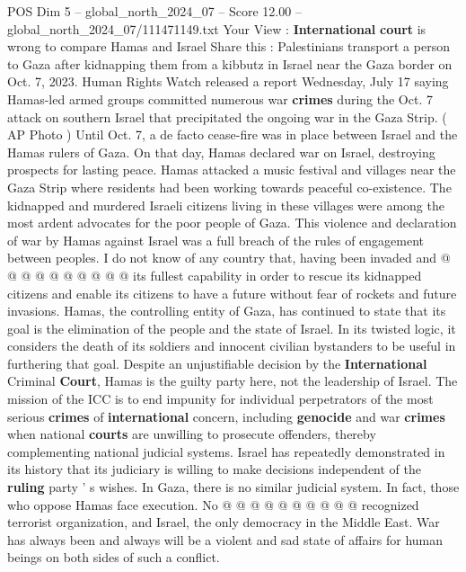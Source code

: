 \begin{textsample}{POS Dim 5 – global\_north\_2024\_07 – Score 12.00 – global\_north\_2024\_07/111471149.txt}  \label{ex:f5_pos_310}
Your View : \textbf{International} \textbf{court} is wrong to compare Hamas and Israel Share this : Palestinians transport a person to Gaza after kidnapping them from a kibbutz in Israel near the Gaza border on Oct. 7, 2023.
Human Rights Watch released a report Wednesday, July 17 saying Hamas-led armed groups committed numerous war \textbf{crimes} during the Oct. 7 attack on southern Israel that precipitated the ongoing war in the Gaza Strip. ( AP Photo ) Until Oct. 7, a de facto cease-fire was in place between Israel and the Hamas rulers of Gaza.
On that day, Hamas declared war on Israel, destroying prospects for lasting peace.
Hamas attacked a music festival and villages near the Gaza Strip where residents had been working towards peaceful co-existence.
The kidnapped and murdered Israeli citizens living in these villages were among the most ardent advocates for the poor people of Gaza.
This violence and declaration of war by Hamas against Israel was a full breach of the rules of engagement between peoples.
I do not know of any country that, having been invaded and @ @ @ @ @ @ @ @ @ @ its fullest capability in order to rescue its kidnapped citizens and enable its citizens to have a future without fear of rockets and future invasions.
Hamas, the controlling entity of Gaza, has continued to state that its goal is the elimination of the people and the state of Israel.
In its twisted logic, it considers the death of its soldiers and innocent civilian bystanders to be useful in furthering that goal.
Despite an unjustifiable decision by the \textbf{International} Criminal \textbf{Court}, Hamas is the guilty party here, not the leadership of Israel.
The mission of the ICC is to end impunity for individual perpetrators of the most serious \textbf{crimes} of \textbf{international} concern, including \textbf{genocide} and war \textbf{crimes} when national \textbf{courts} are unwilling to prosecute offenders, thereby complementing national judicial systems.
Israel has repeatedly demonstrated in its history that its judiciary is willing to make decisions independent of the \textbf{ruling} party ' s wishes.
In Gaza, there is no similar judicial system.
In fact, those who oppose Hamas face execution.
No @ @ @ @ @ @ @ @ @ @ recognized terrorist organization, and Israel, the only democracy in the Middle East.
War has always been and always will be a violent and sad state of affairs for human beings on both sides of such a conflict.

\end{textsample}
